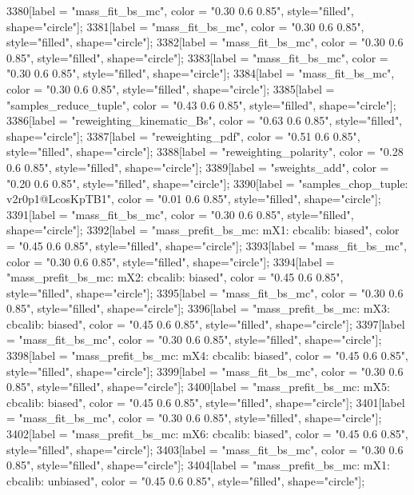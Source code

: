 {	3380[label = "mass_fit_bs_mc", color = "0.30 0.6 0.85", style="filled", shape="circle"];
	3381[label = "mass_fit_bs_mc", color = "0.30 0.6 0.85", style="filled", shape="circle"];
	3382[label = "mass_fit_bs_mc", color = "0.30 0.6 0.85", style="filled", shape="circle"];
	3383[label = "mass_fit_bs_mc", color = "0.30 0.6 0.85", style="filled", shape="circle"];
	3384[label = "mass_fit_bs_mc", color = "0.30 0.6 0.85", style="filled", shape="circle"];
	3385[label = "samples_reduce_tuple", color = "0.43 0.6 0.85", style="filled", shape="circle"];
	3386[label = "reweighting_kinematic_Bs", color = "0.63 0.6 0.85", style="filled", shape="circle"];
	3387[label = "reweighting_pdf", color = "0.51 0.6 0.85", style="filled", shape="circle"];
	3388[label = "reweighting_polarity", color = "0.28 0.6 0.85", style="filled", shape="circle"];
	3389[label = "sweights_add", color = "0.20 0.6 0.85", style="filled", shape="circle"];
	3390[label = "samples_chop_tuple\nversion: v2r0p1@LcosKpTB1", color = "0.01 0.6 0.85", style="filled", shape="circle"];
	3391[label = "mass_fit_bs_mc", color = "0.30 0.6 0.85", style="filled", shape="circle"];
	3392[label = "mass_prefit_bs_mc\nmassbin: mX1\nmassmodel: cbcalib\ntrigger: biased", color = "0.45 0.6 0.85", style="filled", shape="circle"];
	3393[label = "mass_fit_bs_mc", color = "0.30 0.6 0.85", style="filled", shape="circle"];
	3394[label = "mass_prefit_bs_mc\nmassbin: mX2\nmassmodel: cbcalib\ntrigger: biased", color = "0.45 0.6 0.85", style="filled", shape="circle"];
	3395[label = "mass_fit_bs_mc", color = "0.30 0.6 0.85", style="filled", shape="circle"];
	3396[label = "mass_prefit_bs_mc\nmassbin: mX3\nmassmodel: cbcalib\ntrigger: biased", color = "0.45 0.6 0.85", style="filled", shape="circle"];
	3397[label = "mass_fit_bs_mc", color = "0.30 0.6 0.85", style="filled", shape="circle"];
	3398[label = "mass_prefit_bs_mc\nmassbin: mX4\nmassmodel: cbcalib\ntrigger: biased", color = "0.45 0.6 0.85", style="filled", shape="circle"];
	3399[label = "mass_fit_bs_mc", color = "0.30 0.6 0.85", style="filled", shape="circle"];
	3400[label = "mass_prefit_bs_mc\nmassbin: mX5\nmassmodel: cbcalib\ntrigger: biased", color = "0.45 0.6 0.85", style="filled", shape="circle"];
	3401[label = "mass_fit_bs_mc", color = "0.30 0.6 0.85", style="filled", shape="circle"];
	3402[label = "mass_prefit_bs_mc\nmassbin: mX6\nmassmodel: cbcalib\ntrigger: biased", color = "0.45 0.6 0.85", style="filled", shape="circle"];
	3403[label = "mass_fit_bs_mc", color = "0.30 0.6 0.85", style="filled", shape="circle"];
	3404[label = "mass_prefit_bs_mc\nmassbin: mX1\nmassmodel: cbcalib\ntrigger: unbiased", color = "0.45 0.6 0.85", style="filled", shape="circle"];
}
